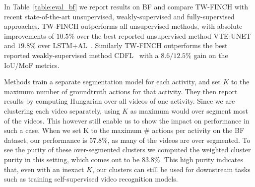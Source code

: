 \documentclass[10pt,twocolumn,letterpaper]{article}
\begin{document}
In Table~\ref{table:eval_bf} we report results on BF and compare TW-FINCH with recent state-of-the-art unsupervised, weakly-supervised and fully-supervised approaches. TW-FINCH outperforms all unsupervised methods, with absolute improvements of
$10.5$\% over the best reported unsupervised method VTE-UNET and $19.8$\% over LSTM+AL~\cite{lstm_al}. Similarly TW-FINCH outperforms the best reported weakly-supervised method CDFL~\cite{cdfl} with a $8.6/12.5$\% gain on the IoU/MoF metrics.

Methods \cite{ute_paper, mallow} train a separate segmentation model for each activity, and set $K$ to the maximum number of groundtruth actions for that activity. They then report results by computing Hungarian over all videos of one activity. Since we are clustering each video separately, using $K$ as maximum would over segment most of the videos. This however still enable us to show the impact on performance in such a case.
When we set K to the maximum \# actions per activity on the BF dataset, our performance is $57.8\%$, as many of the videos are over segmented. 
To see the purity of these over-segmented clusters we computed the weighted cluster purity in this setting, which comes out to be $83.8\%$.
This high purity indicates that, even with an inexact $K$, our clusters can still be used for downstream tasks such as training self-supervised video recognition models.

\begin{table}[t!]
\centering
{}
\caption{Comparison on the Inria Instructional Videos~\cite{yti_paper} dataset. * denotes results with Hungarian computed over all videos of an activity together.
\label{table:eval_yti}}
\end{table}
\end{document}
